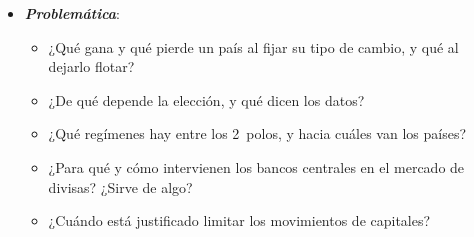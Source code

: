 \documentclass[11pt]{article}
\begin{document}
\begin{itemize}
\begin{itemize}
\begin{itemize}
    \item desde 1973, el , como lo llamó \textcite{Williamson1976Benefits}: cada país elige su régimen y solo tiene que notificarlo al FMI, como quedó en la Segunda Enmienda de su Convenio Constitutivo, en vigor desde 1978. Muchos países dicen flotar pero intervienen (la \emph{flotación sucia}) .
    \end{itemize}
  \item \emph{Una revisión reciente}: desde la crisis de 2008 se han revisado varias ideas sobre los regímenes, la intervención y la regulación.
    \begin{itemize}
    \item El FMI acepta en ciertos casos los controles de capitales (2012, revisado en 2022) y la intervención en el mercado de divisas (su Marco de Política Integrado, de 2020)\nocite{FMI2012VisionInstitucional,FMI2022RevisionVI,FMI2020IPF}.
    \item {} discute si el trilema no es en realidad un dilema\nocite{Rey2013Dilema}, y , entonces economista jefe del FMI, si la depreciación sigue ganando competitividad cuando el comercio se factura en dólares\nocite{Gopinath2020DCP}.
    \end{itemize}
  \item \emph{España ha recorrido casi todo el menú}: tipos de cambio múltiples hasta el Plan de Estabilización de 1959 , la peseta en las bandas del Sistema Monetario Europeo y, desde 1999, el euro, que es fijo frente a sus socios y flota frente al resto del mundo .
  \end{itemize}

\item \textbf{\emph{Problemática}}:
  \begin{itemize}
  \item ¿Qué gana y qué pierde un país al fijar su tipo de cambio, y qué al dejarlo flotar?
  \item ¿De qué depende la elección, y qué dicen los datos?
  \item ¿Qué regímenes hay entre los 2~polos, y hacia cuáles van los países?
  \item ¿Para qué y cómo intervienen los bancos centrales en el mercado de divisas? ¿Sirve de algo?
  \item ¿Cuándo está justificado limitar los movimientos de capitales?
  \end{itemize}


\end{itemize}
\end{document}
